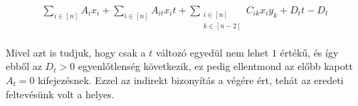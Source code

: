 \begin{theorem}
	\begin{align} \label{MORSUM5}		
		\begin{split}		
			\sum_{i \in \left[ n \right] }{A_{i}x_i} + \sum_{i \in \left[ n \right] }{A_{it}x_it} +	\sum_{\substack{ i \in [n] \\  k \in [n-2]} }{C_{ik}x_i y_k} + D_tt - D_t
		\end{split}
	\end{align}
	

	Mivel azt is tudjuk, hogy csak a $t$ változó egyedül nem lehet $1$ értékű, és így ebből az $D_t > 0$ egyenlőtlenség következik, ez pedig ellentmond az előbb kapott $A_t=0$ kifejezésnek. Ezzel az indirekt bizonyítás a végére ért, tehát az eredeti feltevésünk volt a helyes.

\end{theorem}
